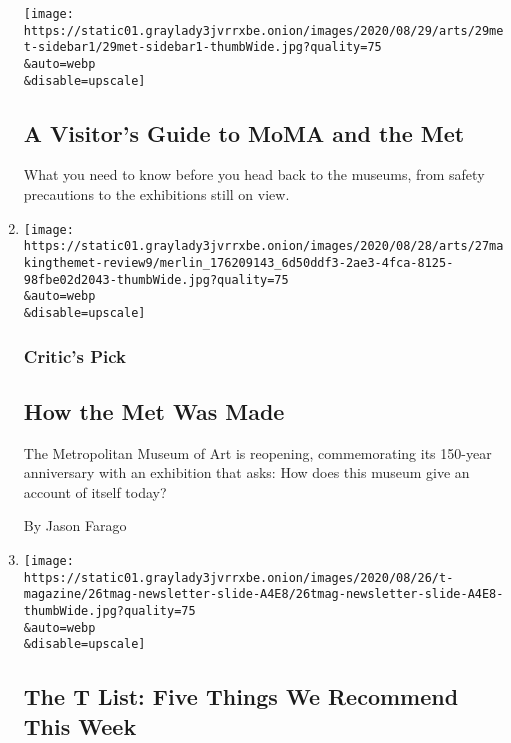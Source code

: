 \begin{enumerate}
  \texttt{[image: https://static01.graylady3jvrrxbe.onion/images/2020/08/29/arts/29met-sidebar1/29met-sidebar1-thumbWide.jpg?quality=75\\\&auto=webp\\\&disable=upscale]}

  \hypertarget{a-visitors-guide-to-moma-and-the-met}{%
  \subsection{A Visitor's Guide to MoMA and the
  Met}\label{a-visitors-guide-to-moma-and-the-met}}

  What you need to know before you head back to the museums, from safety
  precautions to the exhibitions still on view.
\item
  \href{/2020/08/27/arts/design/met-museum-reopens-anniversary.html}{}

  \texttt{[image: https://static01.graylady3jvrrxbe.onion/images/2020/08/28/arts/27makingthemet-review9/merlin\_176209143\_6d50ddf3-2ae3-4fca-8125-98fbe02d2043-thumbWide.jpg?quality=75\\\&auto=webp\\\&disable=upscale]}

  \hypertarget{critics-pick}{%
  \subsubsection{Critic's Pick}\label{critics-pick}}

  \hypertarget{how-the-met-was-made}{%
  \subsection{How the Met Was Made}\label{how-the-met-was-made}}

  The Metropolitan Museum of Art is reopening, commemorating its
  150-year anniversary with an exhibition that asks: How does this
  museum give an account of itself today?

  By Jason Farago
\item
  \href{/2020/08/27/t-magazine/misi-pasta-gregory-halpern.html}{}

  \texttt{[image: https://static01.graylady3jvrrxbe.onion/images/2020/08/26/t-magazine/26tmag-newsletter-slide-A4E8/26tmag-newsletter-slide-A4E8-thumbWide.jpg?quality=75\\\&auto=webp\\\&disable=upscale]}

  \hypertarget{the-t-list-five-things-we-recommend-this-week-1}{%
  \subsection{The T List: Five Things We Recommend This
  Week}\label{the-t-list-five-things-we-recommend-this-week-1}}


\end{enumerate}
